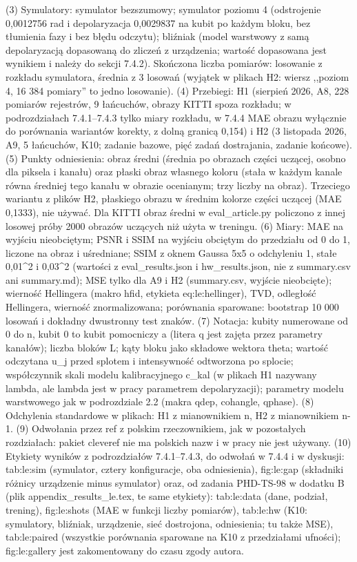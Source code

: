 {(3) Symulatory: symulator bezszumowy; symulator poziomu 4 (odstrojenie 0,0012756 rad i depolaryzacja 0,0029837 na kubit po każdym bloku, bez tłumienia fazy i bez błędu odczytu); bliźniak (model warstwowy z samą depolaryzacją dopasowaną do zliczeń z urządzenia; wartość dopasowana jest wynikiem i należy do sekcji 7.4.2). Skończona liczba pomiarów: losowanie z rozkładu symulatora, średnia z 3 losowań (wyjątek w plikach H2: wiersz ,,poziom 4, 16 384 pomiary'' to jedno losowanie).
(4) Przebiegi: H1 (sierpień 2026, A8, 228 pomiarów rejestrów, 9 łańcuchów, obrazy KITTI spoza rozkładu; w podrozdziałach 7.4.1--7.4.3 tylko miary rozkładu, w 7.4.4 MAE obrazu wyłącznie do porównania wariantów korekty, z dolną granicą 0,154) i H2 (3 listopada 2026, A9, 5 łańcuchów, K10; zadanie bazowe, pięć zadań dostrajania, zadanie końcowe).
(5) Punkty odniesienia: obraz średni (średnia po obrazach części uczącej, osobno dla piksela i kanału) oraz płaski obraz własnego koloru (stała w każdym kanale równa średniej tego kanału w obrazie ocenianym; trzy liczby na obraz). Trzeciego wariantu z plików H2, płaskiego obrazu w średnim kolorze części uczącej (MAE 0,1333), nie używać. Dla KITTI obraz średni w eval_article.py policzono z innej losowej próby 2000 obrazów uczących niż użyta w treningu.
(6) Miary: MAE na wyjściu nieobciętym; PSNR i SSIM na wyjściu obciętym do przedziału od 0 do 1, liczone na obraz i uśredniane; SSIM z oknem Gaussa 5x5 o odchyleniu 1, stałe 0,01^2 i 0,03^2 (wartości z eval_results.json i hw_results.json, nie z summary.csv ani summary.md); MSE tylko dla A9 i H2 (summary.csv, wyjście nieobcięte); wierność Hellingera (makro hfid, etykieta eq:le:hellinger), TVD, odległość Hellingera, wierność znormalizowana; porównania sparowane: bootstrap 10 000 losowań i dokładny dwustronny test znaków.
(7) Notacja: kubity numerowane od 0 do n, kubit 0 to kubit pomocniczy a (litera q jest zajęta przez parametry kanałów); liczba bloków L; kąty bloku jako składowe wektora theta; wartość odczytana u_j przed splotem i intensywność odtworzona po splocie; współczynnik skali modelu kalibracyjnego c_kal (w plikach H1 nazywany lambda, ale lambda jest w pracy parametrem depolaryzacji); parametry modelu warstwowego jak w podrozdziale 2.2 (makra qdep, cohangle, qphase).
(8) Odchylenia standardowe w plikach: H1 z mianownikiem n, H2 z mianownikiem n-1.
(9) Odwołania przez ref z polskim rzeczownikiem, jak w pozostałych rozdziałach: pakiet cleveref nie ma polskich nazw i w pracy nie jest używany.
(10) Etykiety wyników z podrozdziałów 7.4.1--7.4.3, do odwołań w 7.4.4 i w dyskusji: tab:le:sim (symulator, cztery konfiguracje, oba odniesienia), fig:le:gap (składniki różnicy urządzenie minus symulator) oraz, od zadania PHD-TS-98 w dodatku B (plik appendix_results_le.tex, te same etykiety): tab:le:data (dane, podział, trening), fig:le:shots (MAE w funkcji liczby pomiarów), tab:le:hw (K10: symulatory, bliźniak, urządzenie, sieć dostrojona, odniesienia; tu także MSE), tab:le:paired (wszystkie porównania sparowane na K10 z przedziałami ufności); fig:le:gallery jest zakomentowany do czasu zgody autora.
}
